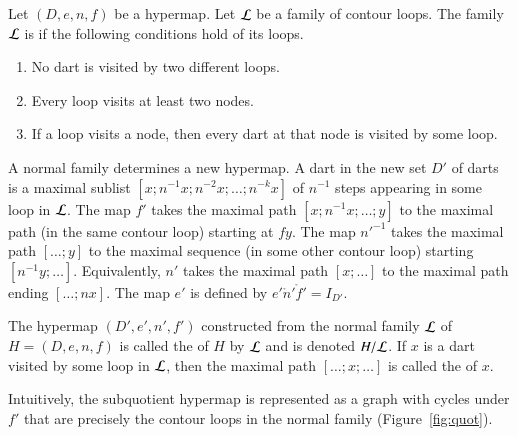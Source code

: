 \begin{definition}
Let $(D,e,n,f)$ be a hypermap. 
Let $\cal L$ be a family of contour
loops.  The family $\cal L$ is   if the following
conditions hold of its loops. \begin{enumerate}
\item  No dart is visited by two different loops.
\item  Every loop visits at least two nodes.
\item  If a loop visits a node, then every dart at that node is visited
by some loop.
\end{enumerate}
\end{definition}


A normal family determines a new hypermap.  A dart in the new set $D'$
of darts is a maximal sublist $[x;n^{-1} x; n^{-2} x;\ldots;n^{-k}
x]$ of $n^{-1}$ steps appearing in some loop in $\cal L$. The map $f'$
takes the maximal path $[x;n^{-1}x;\ldots;y]$ to the maximal path (in
the same contour loop) starting at $f y$. The map ${n'}^{-1}$ takes
the maximal path $[\ldots;y]$ to the maximal sequence (in some other
contour loop) starting $[n^{-1}y;\ldots]$. Equivalently, $n'$ takes
the maximal path $[x;\ldots]$ to the maximal path ending $[\ldots;n
x]$. The map $e'$ is defined by $e'\ocirc n'\ocirc f' = I_{D'}$.
%

\begin{definition}[subquotient]
 The hypermap $(D',e',n',f')$
constructed from the normal
family $\cal L$ of $H=(D,e,n,f)$ 
is called the  of $H$ by $\cal L$ and is denoted
$H/{\cal L}$.  If $x$ is a dart visited by some loop in $\cal L$, then
the maximal path $[\ldots;x;\ldots]$ is called the  of $x$.
%
\end{definition}
%
%
%
%

Intuitively, the subquotient hypermap is represented as a graph with
cycles under $f'$ that are precisely the contour loops in the normal family
(Figure~\ref{fig:quot}).

